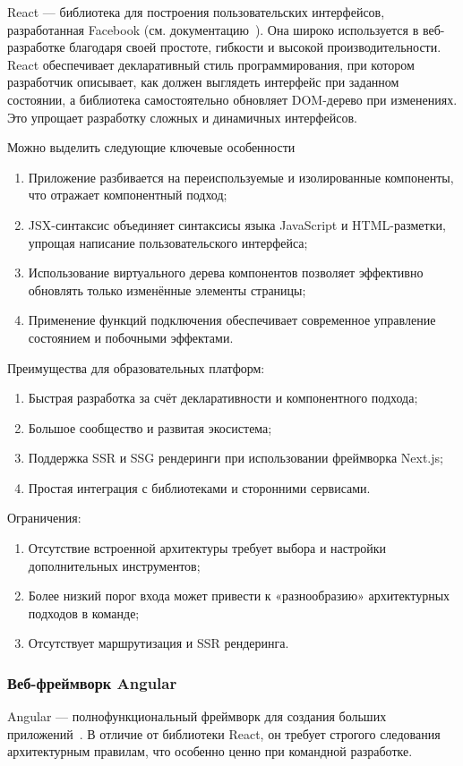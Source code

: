React — библиотека для построения пользовательских интерфейсов, разработанная Facebook (см. документацию~\cite{react_getting_started}). Она широко используется в веб-разработке благодаря своей простоте, гибкости и высокой производительности. React обеспечивает декларативный стиль программирования, при котором разработчик описывает, как должен выглядеть интерфейс при заданном состоянии, а библиотека самостоятельно обновляет DOM-дерево при изменениях. Это упрощает разработку сложных и динамичных интерфейсов.

Можно выделить следующие ключевые особенности
\begin{enumerate}
  \item Приложение разбивается на переиспользуемые и изолированные компоненты, что отражает компонентный подход;
  \item JSX-синтаксис объединяет синтаксисы языка JavaScript и HTML-разметки, упрощая написание пользовательского интерфейса;
  \item Использование виртуального дерева компонентов позволяет эффективно обновлять только изменённые элементы страницы;
  \item Применение функций подключения обеспечивает современное управление состоянием и побочными эффектами.
\end{enumerate}


Преимущества для образовательных платформ:
\begin{enumerate}
  \item Быстрая разработка за счёт декларативности и компонентного подхода;
  \item Большое сообщество и развитая экосистема;
  \item Поддержка SSR и SSG рендеринги при использовании фреймворка Next.js;
  \item Простая интеграция с библиотеками и сторонними сервисами.
\end{enumerate}

Ограничения:
\begin{enumerate}
  \item Отсутствие встроенной архитектуры требует выбора и настройки дополнительных инструментов;
  \item Более низкий порог входа может привести к «разнообразию» архитектурных подходов в команде;
  \item Отсутствует маршрутизация и SSR рендеринга.
\end{enumerate}

\subsubsection{Веб-фреймворк Angular}
Angular --- полнофункциональный фреймворк для создания больших приложений~\cite{angular_overview}. В отличие от библиотеки React, он требует строгого следования архитектурным правилам, что особенно ценно при командной разработке.

